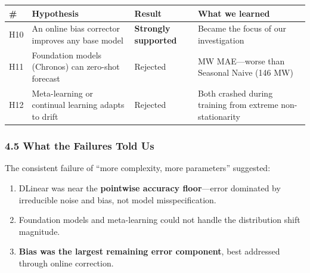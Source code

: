 {\def\LTcaptype{none} %
\begin{longtable}[]{@{}
  >{\raggedright\arraybackslash}p{}
  >{\raggedright\arraybackslash}p{}
  >{\raggedright\arraybackslash}p{}
  >{\raggedright\arraybackslash}p{}@{}}
\toprule\noalign{}
\begin{minipage}[b]{\linewidth}\raggedright
\#
\end{minipage} & \begin{minipage}[b]{\linewidth}\raggedright
Hypothesis
\end{minipage} & \begin{minipage}[b]{\linewidth}\raggedright
Result
\end{minipage} & \begin{minipage}[b]{\linewidth}\raggedright
What we learned
\end{minipage} \\
\midrule\noalign{}
\endhead
\bottomrule\noalign{}
\endlastfoot
H10 & An online bias corrector improves any base model &
\textbf{Strongly supported} & Became the focus of our investigation \\
H11 & Foundation models (Chronos) can zero-shot forecast & Rejected &
172 MW MAE---worse than Seasonal Naive (146 MW) \\
H12 & Meta-learning or continual learning adapts to drift & Rejected &
Both crashed during training from extreme non-stationarity \\
\end{longtable}
}

\subsubsection{4.5 What the Failures Told
Us}\label{what-the-failures-told-us}

The consistent failure of ``more complexity, more parameters''
suggested:

\begin{enumerate}
\def\labelenumi{\arabic{enumi}.}
\tightlist
\item
  DLinear was near the \textbf{pointwise accuracy floor}---error
  dominated by irreducible noise and bias, not model misspecification.
\item
  Foundation models and meta-learning could not handle the distribution
  shift magnitude.
\item
  \textbf{Bias was the largest remaining error component}, best
  addressed through online correction.
\end{enumerate}

